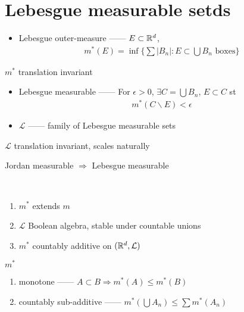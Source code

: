 \section{Lebesgue measurable setds}\label{sec:lebesgue-measurable-sets}

\begin{itemize}
    \item Lebesgue outer-measure ------ $E \subset \mathbb{R}^d$,
    \begin{align*}
        m^{\ast}(E) = \inf \{ \sum |B_n| : E \subset \bigcup B_n \text{ boxes}\}
    \end{align*}
\end{itemize}

\begin{fact}
    $m^\ast$ translation invariant
\end{fact}

\begin{itemize}
    \item Lebesgue measurable ------ For $\epsilon > 0$, $\exists C = \bigcup B_n$, $E \subset C$ st
    \begin{align*}
        m^\ast (C \backslash E) < \epsilon
    \end{align*}
    \item $\mathcal{L}$ ------ family of Lebesgue measurable sets
\end{itemize}

\begin{fact}
    $\mathcal{L}$ translation invariant, scales naturally
\end{fact}

\begin{fact}
    Jordan measurable $\Rightarrow$ Lebesgue measurable
\end{fact}

\begin{prop}
    \,
    \begin{enumerate}
        \item $m^\ast$ extends $m$
        \item $\mathcal{L}$ Boolean algebra, stable under countable unions
        \item $m^\ast$ countably additive on $(\mathbb{R}^d, \mathcal{L})$
    \end{enumerate}
\end{prop}

\begin{lemma}
    $m^\ast$
    \begin{enumerate}
        \item monotone ------ $A \subset B \Rightarrow m^\ast(A) \leq m^\ast(B)$
        \item countably sub-additive ------ $m^\ast\left(\bigcup A_n\right) \leq \sum m^\ast(A_n)$
    \end{enumerate}
\end{lemma}

